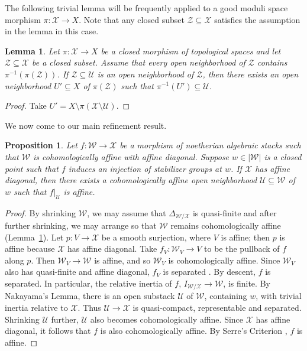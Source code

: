 \documentclass[a4paper]{amsart}
\theoremstyle{plain}
\newtheorem{lemma}[theorem]{Lemma}
\newtheorem{proposition}[theorem]{Proposition}
\theoremstyle{definition}
\theoremstyle{remark}
\numberwithin{equation}{section}
\newcommand{\stX}{\mathcal{X}} %
\newcommand\cW{\mathcal{W}}
\newcommand\cU{\mathcal{U}}
\newcommand\cX{\mathcal{X}}
\newcommand\cZ{\mathcal{Z}}
\newcommand\co{\colon}
\begin{document}
 
 The following trivial lemma will be frequently applied to a good moduli space
 morphism $\pi \colon \cX \to X$. Note that any closed subset $\cZ\subseteq
 \cX$ satisfies the assumption in the lemma in this case.
 \begin{lemma}\label{L:shrink}
   Let $\pi\colon \cX \to X$ be a closed morphism of topological spaces and
   let $\cZ\subseteq \cX$ be a closed subset. Assume that every open
   neighborhood of $\cZ$ contains $\pi^{-1}(\pi(\cZ))$. If $\cZ \subseteq \cU$
   is an open neighborhood of $\cZ$, then there exists an open neighborhood
   $U' \subseteq X$ of $\pi(\cZ)$ such that $\pi^{-1}(U') \subseteq \cU$.
 \end{lemma} 
\begin{proof}
Take $U'=X\setminus \pi(\cX\setminus \cU)$.
\end{proof}
We now come to our main refinement result.
\begin{proposition} \label{P:refinement}
 Let $f \co \cW \to \cX$ be a morphism of noetherian algebraic stacks such that $\cW$ is cohomologically affine with affine diagonal. Suppose $w \in |\cW|$ is a closed point such that $f$ induces an injection of stabilizer groups at $w$.  
 If $\cX$ has affine diagonal, then there exists a cohomologically affine open neighborhood $\cU \subseteq \cW$ of $w$ such that $f|_{\cU}$ is affine.
\end{proposition}
\begin{proof}
  By shrinking $\cW$, we may assume that $\Delta_{\cW/\cX}$ is
  quasi-finite and after further shrinking, we may arrange so that
  $\cW$ remains cohomologically affine (Lemma~\ref{L:shrink}). Let
  $p\colon V \to \stX$ be a smooth surjection, where $V$ is affine;
  then $p$ is affine because $\stX$ has affine diagonal. Take
  $f_V \colon \cW_V \to V$ to be the pullback of $f$ along
  $p$. Then $\cW_V \to \cW$ is affine, and so $\cW_V$ is
  cohomologically affine.  Since $\cW_V$ also has quasi-finite and
  affine diagonal, $f_V$ is separated
  \cite[Thm.~8.3.2]{alper-adequate}. By descent, $f$ is separated. In
  particular, the relative inertia of $f$,
  $I_{\cW/\cX} \to \cW$, is finite. By Nakayama's Lemma, there
  is an open substack $\cU$ of $\cW$, containing $w$, with trivial
  inertia relative to $\cX$. Thus $\cU\to \cX$ is quasi-compact,
  representable and separated. Shrinking $\cU$ further, $\cU$
  also becomes cohomologically affine. Since
  $\cX$ has affine diagonal, it follows that $f$ is also
  cohomologically affine. By Serre's Criterion
  \cite[Prop.~3.3]{alper-good}, $f$ is affine.
\end{proof}
\end{document}
